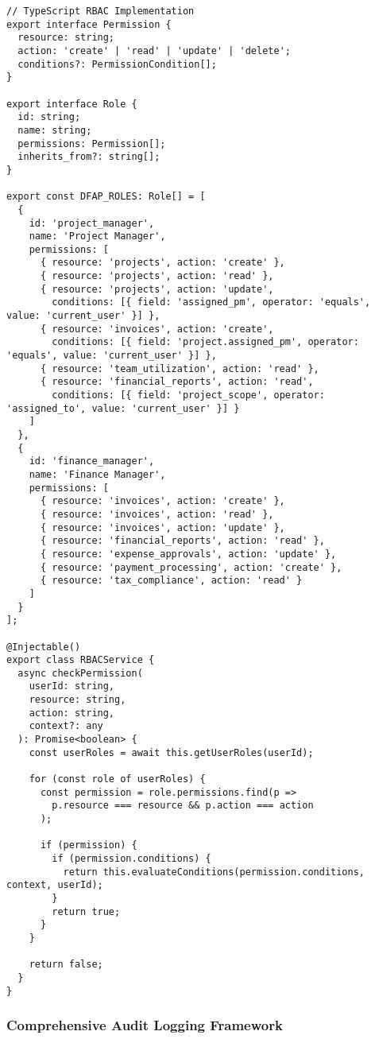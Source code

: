 \begin{verbatim}
// TypeScript RBAC Implementation
export interface Permission {
  resource: string;
  action: 'create' | 'read' | 'update' | 'delete';
  conditions?: PermissionCondition[];
}

export interface Role {
  id: string;
  name: string;
  permissions: Permission[];
  inherits_from?: string[];
}

export const DFAP_ROLES: Role[] = [
  {
    id: 'project_manager',
    name: 'Project Manager',
    permissions: [
      { resource: 'projects', action: 'create' },
      { resource: 'projects', action: 'read' },
      { resource: 'projects', action: 'update', 
        conditions: [{ field: 'assigned_pm', operator: 'equals', value: 'current_user' }] },
      { resource: 'invoices', action: 'create',
        conditions: [{ field: 'project.assigned_pm', operator: 'equals', value: 'current_user' }] },
      { resource: 'team_utilization', action: 'read' },
      { resource: 'financial_reports', action: 'read',
        conditions: [{ field: 'project_scope', operator: 'assigned_to', value: 'current_user' }] }
    ]
  },
  {
    id: 'finance_manager',
    name: 'Finance Manager', 
    permissions: [
      { resource: 'invoices', action: 'create' },
      { resource: 'invoices', action: 'read' },
      { resource: 'invoices', action: 'update' },
      { resource: 'financial_reports', action: 'read' },
      { resource: 'expense_approvals', action: 'update' },
      { resource: 'payment_processing', action: 'create' },
      { resource: 'tax_compliance', action: 'read' }
    ]
  }
];

@Injectable()
export class RBACService {
  async checkPermission(
    userId: string, 
    resource: string, 
    action: string, 
    context?: any
  ): Promise<boolean> {
    const userRoles = await this.getUserRoles(userId);
    
    for (const role of userRoles) {
      const permission = role.permissions.find(p => 
        p.resource === resource && p.action === action
      );
      
      if (permission) {
        if (permission.conditions) {
          return this.evaluateConditions(permission.conditions, context, userId);
        }
        return true;
      }
    }
    
    return false;
  }
}
\end{verbatim}

\subsubsection{Comprehensive Audit Logging Framework}

